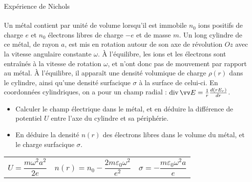 \documentclass[french, a4paper, 11pt]{article}
\DeclareMathOperator{\diverg}{div}        %
\begin{document}
\begin{cadre}{Expérience de Nichols}
  \paragraph*{}
  Un métal contient par unité de volume lorsqu'il est immobile \(n_{0}\) ions positifs de charge \(e\) et \(n_{0}\) électrons libres de charge \(-e\) et de masse \(m\). Un long cylindre de ce métal, de rayon \(a\), est mis en rotation autour de son axe de révolution \(Oz\) avec la vitesse angulaire constante \(\omega\). À l'équilibre, les ions et les électrons sont entraînés à la vitesse de rotation \(\omega\), et n'ont donc pas de mouvement par rapport au métal. À l'équilibre, il apparaît une densité volumique de charge \(\rho(r)\) dans le cylindre, ainsi qu'une densité surfacique \(\sigma\) à la surface de celui-ci. En coordonnées cylindriques, on a pour un champ radial : \(\diverg \vv E = \frac{1}{r}\frac{d(rE_{r})}{dr}\).
  \begin{itemize}[label=\(\bullet\)]
    \item Calculer le champ électrique dans le métal, et en déduire la différence de potentiel \(U\) entre l'axe du cylindre et sa périphérie.
    \item En déduire la densité \(n(r)\) des électrons libres dans le volume du métal, et le charge surfacique \(\sigma\).
  \end{itemize}
  \tcblower
  \begin{tabularx}{\linewidth}{XXr}
    \(U = \dfrac{m\omega^{2}a^{2}}{2e}\) &
    \(n(r) = n_{0} - \dfrac{2m\varepsilon_{0}\omega^{2}}{e^{2}}\) &
    \(\sigma = -\dfrac{m\varepsilon_{0}\omega^{2}a}{e}\)
  \end{tabularx}
\end{cadre}
\end{document}
